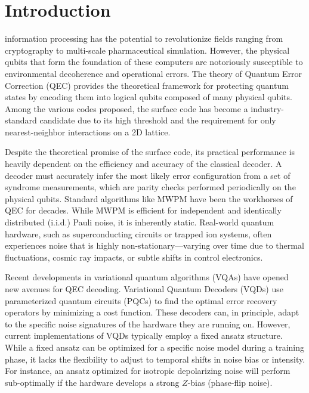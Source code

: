 \documentclass[journal,twocolumn]{IEEEtran}
\begin{document}
\section{Introduction}

 information processing has the potential to revolutionize fields ranging from cryptography to multi-scale pharmaceutical simulation. However, the physical qubits that form the foundation of these computers are notoriously susceptible to environmental decoherence and operational errors. The theory of Quantum Error Correction (QEC) provides the theoretical framework for protecting quantum states by encoding them into logical qubits composed of many physical qubits. Among the various codes proposed, the surface code \cite{fowler2012surface} has become a industry-standard candidate due to its high threshold and the requirement for only nearest-neighbor interactions on a 2D lattice.

Despite the theoretical promise of the surface code, its practical performance is heavily dependent on the efficiency and accuracy of the classical decoder. A decoder must accurately infer the most likely error configuration from a set of syndrome measurements, which are parity checks performed periodically on the physical qubits. Standard algorithms like MWPM \cite{edmonds1965paths} have been the workhorses of QEC for decades. While MWPM is efficient for independent and identically distributed (i.i.d.) Pauli noise, it is inherently static. Real-world quantum hardware, such as superconducting circuits or trapped ion systems, often experiences noise that is highly non-stationary—varying over time due to thermal fluctuations, cosmic ray impacts, or subtle shifts in control electronics.

Recent developments in variational quantum algorithms (VQAs) \cite{cerezo2021variational} have opened new avenues for QEC decoding. Variational Quantum Decoders (VQDs) use parameterized quantum circuits (PQCs) to find the optimal error recovery operators by minimizing a cost function. These decoders can, in principle, adapt to the specific noise signatures of the hardware they are running on. However, current implementations of VQDs typically employ a fixed ansatz structure. While a fixed ansatz can be optimized for a specific noise model during a training phase, it lacks the flexibility to adjust to temporal shifts in noise bias or intensity. For instance, an ansatz optimized for isotropic depolarizing noise will perform sub-optimally if the hardware develops a strong $Z$-bias (phase-flip noise).
\end{document}
